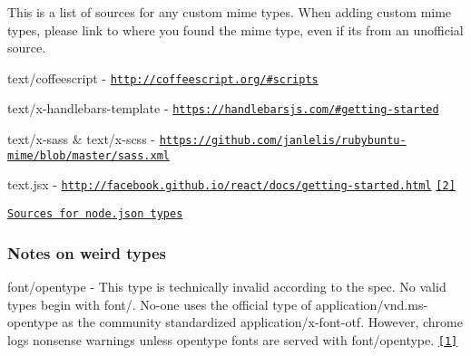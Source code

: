 This is a list of sources for any custom mime types. When adding custom mime types, please link to where you found the mime type, even if it\textquotesingle{}s from an unofficial source.


\begin{DoxyItemize}
\item {\ttfamily text/coffeescript} -\/ \href{http://coffeescript.org/#scripts}{\tt http\+://coffeescript.\+org/\#scripts}
\item {\ttfamily text/x-\/handlebars-\/template} -\/ \href{https://handlebarsjs.com/#getting-started}{\tt https\+://handlebarsjs.\+com/\#getting-\/started}
\item {\ttfamily text/x-\/sass} \& {\ttfamily text/x-\/scss} -\/ \href{https://github.com/janlelis/rubybuntu-mime/blob/master/sass.xml}{\tt https\+://github.\+com/janlelis/rubybuntu-\/mime/blob/master/sass.\+xml}
\item {\ttfamily text.\+jsx} -\/ \href{http://facebook.github.io/react/docs/getting-started.html}{\tt http\+://facebook.\+github.\+io/react/docs/getting-\/started.\+html} \href{https://github.com/facebook/react/blob/f230e0a03154e6f8a616e0da1fb3d97ffa1a6472/vendor/browser-transforms.js#L210}{\tt \mbox{[}2\mbox{]}}
\end{DoxyItemize}

\href{https://github.com/broofa/node-mime/blob/master/types/node.types}{\tt Sources for node.\+json types}

\subsubsection*{Notes on weird types}


\begin{DoxyItemize}
\item {\ttfamily font/opentype} -\/ This type is technically invalid according to the spec. No valid types begin with {\ttfamily font/}. No-\/one uses the official type of {\ttfamily application/vnd.\+ms-\/opentype} as the community standardized {\ttfamily application/x-\/font-\/otf}. However, chrome logs nonsense warnings unless opentype fonts are served with {\ttfamily font/opentype}. \href{http://stackoverflow.com/questions/2871655/proper-mime-type-for-fonts}{\tt \mbox{[}1\mbox{]}} 
\end{DoxyItemize}